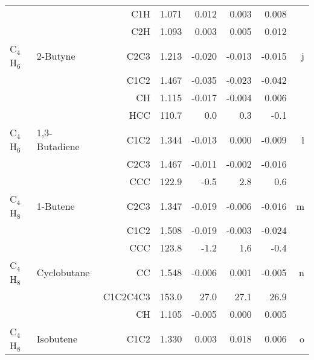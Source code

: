 \begin{table}
\begin{center}
\begin{tabular}{llrrrrrr}
             &                                    &C1H           &     1.071   &     0.012 &     0.003 &     0.008 &       \\
             &                                    &C2H           &     1.093   &     0.003 &     0.005 &     0.012 &       \\
 C$_4$H$_6$        & 2-Butyne                           &C2C3          &     1.213   &    -0.020 &    -0.013 &    -0.015 &     j \\
             &                                    &C1C2          &     1.467   &    -0.035 &    -0.023 &    -0.042 &       \\
             &                                    &CH            &     1.115   &    -0.017 &    -0.004 &     0.006 &       \\
             &                                    &HCC         &     110.7   &       0.0 &       0.3 &      -0.1   &       \\
 C$_4$H$_6$        & 1,3-Butadiene                      &C1C2          &     1.344   &    -0.013 &     0.000 &    -0.009 &     l \\
             &                                    &C2C3          &     1.467   &    -0.011 &    -0.002 &    -0.016 &       \\
             &                                    &CCC         &     122.9   &      -0.5 &       2.8 &       0.6   &       \\
 C$_4$H$_8$        & 1-Butene                           &C2C3          &     1.347   &    -0.019 &    -0.006 &    -0.016 &     m \\
             &                                    &C1C2          &     1.508   &    -0.019 &    -0.003 &    -0.024 &       \\
             &                                    &CCC         &     123.8   &      -1.2 &       1.6 &      -0.4   &       \\
 C$_4$H$_8$        & Cyclobutane                        &CC            &     1.548   &    -0.006 &     0.001 &    -0.005 &     n \\
             &                                    &C1C2C4C3    &     153.0   &      27.0 &      27.1 &      26.9   &       \\
             &                                    &CH            &     1.105   &    -0.005 &     0.000 &     0.005 &       \\
 C$_4$H$_8$        & Isobutene                          &C1C2          &     1.330   &     0.003 &     0.018 &     0.006 &     o \\

\end{tabular}
\end{center}
\end{table}
